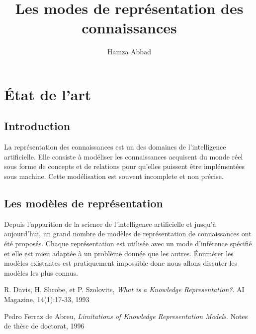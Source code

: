 \documentclass[12pt,a4paper]{report}
\author{Hamza Abbad}
\title{Les modes de représentation des connaissances}
\begin{document}
\maketitle
\chapter{\'Etat de l'art}
\section{Introduction}
La représentation des connaissances est un des domaines de l'intelligence artificielle. Elle consiste à modéliser
les connaissances acquisent du monde réel sous forme de concepts et de relations pour qu'elles puissent être
implémentées sous machine. Cette modélisation est souvent incomplete et non précise.\cite{WKR}

\section{Les modèles de représentation}
Depuis l'apparition de la science de l'intelligence artificielle et jusqu'à aujourd'hui, un grand nombre de modèles
de représentation de connaissances ont été proposés. Chaque représentation est utilisée avec un mode d'inférence spécifié
et elle est mieu adaptée à un problème donnée que les autres. \'Enumérer les modèles existantes est pratiquement impossible
donc nous allons discuter les modèles les plus connus.\cite{LKRM}

\begin{thebibliography}{9}
R. Davis, H. Shrobe, et P. Szolovits,
\emph{What is a Knowledge Representation?}.
AI Magazine, 14(1):17-33, 1993

Pedro Ferraz de Abreu,
\emph{Limitations of Knowledge Representation Models}.
Notes de thèse de doctorat, 1996 
\end{thebibliography}
\end{document}
